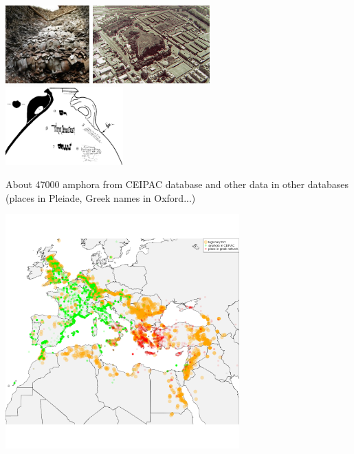 \documentclass[final]{beamer}
\begin{document}
\begin{frame}
\begin{columns}
\begin{block}
		\begin{center}
			\includegraphics[height=3cm]{./Mount-Testaccio.jpg}
			\hfil \includegraphics[height=3cm]{./Mount-Testaccio2.jpg}\\
			\vfill
			\includegraphics[height=3cm]{./titulus.png}

		\end{center}


		About 47000 amphora from CEIPAC database and other data in other databases (places in Pleiade, Greek names in Oxford...)

		\begin{center}
			\includegraphics[width=9cm]{./fortGreekPlaceAndAmphora.png}
		\end{center}
	\end{block}


\end{columns}
\end{frame}
\end{document}
